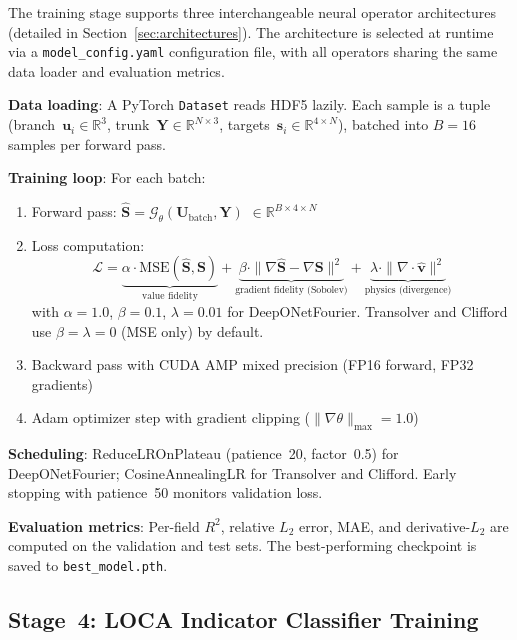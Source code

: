 \documentclass[conference]{IEEEtran}
\begin{document}
The training stage supports three interchangeable neural operator architectures (detailed in Section~\ref{sec:architectures}). The architecture is selected at runtime via a \texttt{model\_config.yaml} configuration file, with all operators sharing the same data loader and evaluation metrics.

\textbf{Data loading}: A PyTorch \texttt{Dataset} reads HDF5 lazily. Each sample is a tuple (branch~$\bm{u}_i \in \mathbb{R}^3$, trunk~$\bm{Y} \in \mathbb{R}^{N \times 3}$, targets~$\bm{s}_i \in \mathbb{R}^{4 \times N}$), batched into $B = 16$ samples per forward pass.

\textbf{Training loop}: For each batch:
\begin{enumerate}
    \item Forward pass: $\hat{\bm{S}} = \mathcal{G}_\theta(\bm{U}_\text{batch}, \bm{Y})$ $\in \mathbb{R}^{B \times 4 \times N}$
    \item Loss computation:
    \begin{equation}
    \mathcal{L} = \underbrace{\alpha \cdot \text{MSE}(\hat{\bm{S}}, \bm{S})}_{\text{value fidelity}} + \underbrace{\beta \cdot \|\nabla\hat{\bm{S}} - \nabla\bm{S}\|^2}_{\text{gradient fidelity (Sobolev)}} + \underbrace{\lambda \cdot \|{\nabla \!\cdot\! \hat{\bm{v}}}\|^2}_{\text{physics (divergence)}}
    \label{eq:total_loss}
    \end{equation}
    with $\alpha = 1.0$, $\beta = 0.1$, $\lambda = 0.01$ for DeepONetFourier. Transolver and Clifford use $\beta = \lambda = 0$ (MSE only) by default.
    \item Backward pass with CUDA AMP mixed precision (FP16 forward, FP32 gradients)
    \item Adam optimizer step with gradient clipping ($\|\nabla\theta\|_\text{max} = 1.0$)
\end{enumerate}

\textbf{Scheduling}: ReduceLROnPlateau (patience~20, factor~0.5) for DeepONetFourier; CosineAnnealingLR for Transolver and Clifford. Early stopping with patience~50 monitors validation loss.

\textbf{Evaluation metrics}: Per-field $R^2$, relative $L_2$ error, MAE, and derivative-$L_2$ are computed on the validation and test sets. The best-performing checkpoint is saved to \texttt{best\_model.pth}.

\subsection{Stage~4: LOCA Indicator Classifier Training}
\end{document}
